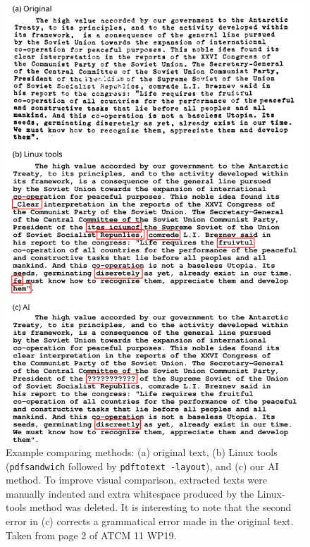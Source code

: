 \documentclass[12pt]{article}
\begin{document}
\begin{figure}[h]
    \begin{minipage}[b]{0.30\textwidth}
        \caption{
            Example comparing methods: (a) original text,
            (b) Linux tools ({\tt pdfsandwich} followed by {\tt pdftotext -layout}),
            and (c) our AI method.
            To improve visual comparison,
            extracted texts were manually indented
            and extra whitespace produced by the Linux-tools method was deleted.
            It is interesting to note that the second error in (c) 
            corrects a grammatical error made in the original text.
            Taken from page 2 of ATCM 11 WP19.
        } \label{compare_methods}
    \end{minipage}
    \hfill
    \begin{minipage}[b]{0.65\textwidth}
        \begin{center}
            \includegraphics[width=\textwidth]{figures/compare_methods.png}
        \end{center}
    \end{minipage}
\end{figure}
\end{document}
